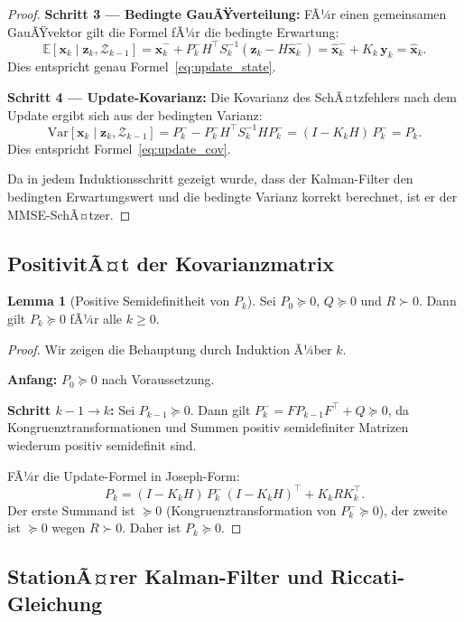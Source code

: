 ﻿\documentclass[a4paper,12pt]{article}
\theoremstyle{definition}
\newtheorem{lemma}{Lemma}
\begin{document}
\begin{proof}
\textbf{Schritt 3 --- Bedingte GauÃŸverteilung:}
FÃ¼r einen gemeinsamen GauÃŸvektor gilt die Formel fÃ¼r die bedingte Erwartung:
\[
    \mathbb{E}[\mathbf{x}_k \mid \mathbf{z}_k, \mathcal{Z}_{k-1}]
    = \hat{\mathbf{x}}_k^- + P_k^- H^\top S_k^{-1}(\mathbf{z}_k - H\hat{\mathbf{x}}_k^-)
    = \hat{\mathbf{x}}_k^- + K_k\,\mathbf{y}_k
    = \hat{\mathbf{x}}_k.
\]
Dies entspricht genau Formel~\eqref{eq:update_state}.

\textbf{Schritt 4 --- Update-Kovarianz:}
Die Kovarianz des SchÃ¤tzfehlers nach dem Update ergibt sich aus der bedingten Varianz:
\[
    \mathrm{Var}[\mathbf{x}_k \mid \mathbf{z}_k, \mathcal{Z}_{k-1}]
    = P_k^- - P_k^- H^\top S_k^{-1} H P_k^-
    = (I - K_k H)\,P_k^-
    = P_k.
\]
Dies entspricht Formel~\eqref{eq:update_cov}.

Da in jedem Induktionsschritt gezeigt wurde, dass der Kalman-Filter den bedingten
Erwartungswert und die bedingte Varianz korrekt berechnet, ist er der MMSE-SchÃ¤tzer.
\end{proof}

\subsection{PositivitÃ¤t der Kovarianzmatrix}

\begin{lemma}[Positive Semidefinitheit von $P_k$]
\label{lem:psd}
    Sei $P_0 \succeq 0$, $Q \succeq 0$ und $R \succ 0$. Dann gilt $P_k \succeq 0$ fÃ¼r alle $k \geq 0$.
\end{lemma}

\begin{proof}
Wir zeigen die Behauptung durch Induktion Ã¼ber $k$.

\textbf{Anfang:} $P_0 \succeq 0$ nach Voraussetzung.

\textbf{Schritt $k-1 \to k$:} Sei $P_{k-1} \succeq 0$.
Dann gilt $P_k^- = F P_{k-1} F^\top + Q \succeq 0$, da Kongruenztransformationen
und Summen positiv semidefiniter Matrizen wiederum positiv semidefinit sind.

FÃ¼r die Update-Formel in Joseph-Form:
\[
    P_k = (I - K_k H)\,P_k^-\,(I - K_k H)^\top + K_k R K_k^\top.
\]
Der erste Summand ist $\succeq 0$ (Kongruenztransformation von $P_k^- \succeq 0$),
der zweite ist $\succeq 0$ wegen $R \succ 0$.
Daher ist $P_k \succeq 0$.
\end{proof}

\subsection{StationÃ¤rer Kalman-Filter und Riccati-Gleichung}
\end{document}
